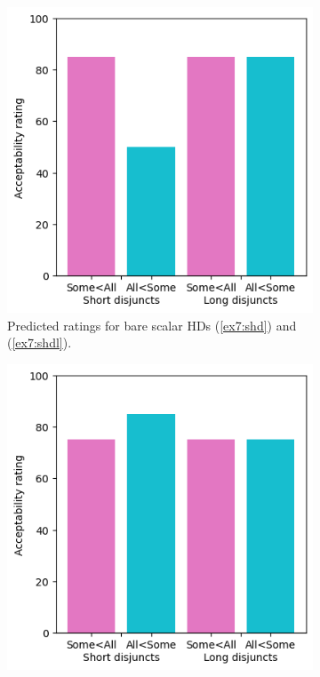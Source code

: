 \begin{figure}[H]
	\centering
	\begin{subfigure}[b]{.3\linewidth}
		\centering
		\includegraphics[width=\linewidth]{./pred-1a+2-noonly.png}
		\caption[]{Predicted ratings for bare scalar HDs (\ref{ex7:shd}) and (\ref{ex7:shdl}).}
	\end{subfigure}
	\hfill
	\begin{subfigure}[b]{.3\linewidth}
		\centering
		\includegraphics[width=\linewidth]{./pred-1a+2-only.png}

\end{subfigure}
\end{figure}
